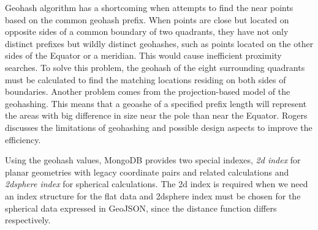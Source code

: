 \documentclass[a4paper,12pt]{article}
\begin{document}
Geohash algorithm has a shortcoming when attempts to find the near points based on the common geohash prefix. When points are close but located on opposite sides of a common boundary of two quadrants, they have not only distinct prefixes but wildly distinct geohashes, such as points located on the other sides of the Equator or a meridian. This would cause inefficient proximity searches. To solve this problem, the geohash of the eight surrounding quadrants must be calculated to find the matching locations residing on both sides of boundaries. 
Another problem comes from the projection-based model of the geohashing. This means that a geoashe of a specified prefix length will represent the areas with big difference in size near the pole than near the Equator. 
Rogers~\cite{www/geohash-limit} discusses the limitations of geohashing and possible design aspects to improve the efficiency.




Using the geohash values, MongoDB provides two special indexes, \textit{2d index} for planar geometries with legacy coordinate pairs and related calculations and \textit{2dsphere index} for spherical calculations. The 2d index is required when we need an index structure for the flat data and 
2dsphere index must be chosen for the spherical data expressed in GeoJSON, since the distance function differs respectively.
\end{document}
